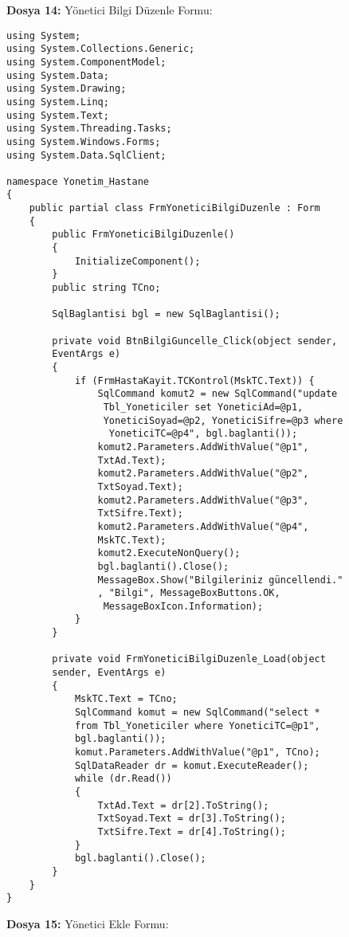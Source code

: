 \textbf{Dosya 14:} Yönetici Bilgi Düzenle Formu:

\begin{lstlisting}
using System;
using System.Collections.Generic;
using System.ComponentModel;
using System.Data;
using System.Drawing;
using System.Linq;
using System.Text;
using System.Threading.Tasks;
using System.Windows.Forms;
using System.Data.SqlClient;

namespace Yonetim_Hastane
{
    public partial class FrmYoneticiBilgiDuzenle : Form
    {
        public FrmYoneticiBilgiDuzenle()
        {
            InitializeComponent();
        }
        public string TCno;

        SqlBaglantisi bgl = new SqlBaglantisi();

        private void BtnBilgiGuncelle_Click(object sender, 
        EventArgs e)
        {
            if (FrmHastaKayit.TCKontrol(MskTC.Text)) {
                SqlCommand komut2 = new SqlCommand("update
                 Tbl_Yoneticiler set YoneticiAd=@p1, 
                 YoneticiSoyad=@p2, YoneticiSifre=@p3 where
                  YoneticiTC=@p4", bgl.baglanti());
                komut2.Parameters.AddWithValue("@p1", 
                TxtAd.Text);
                komut2.Parameters.AddWithValue("@p2", 
                TxtSoyad.Text);
                komut2.Parameters.AddWithValue("@p3", 
                TxtSifre.Text);
                komut2.Parameters.AddWithValue("@p4", 
                MskTC.Text);
                komut2.ExecuteNonQuery();
                bgl.baglanti().Close();
                MessageBox.Show("Bilgileriniz güncellendi."
                , "Bilgi", MessageBoxButtons.OK,
                 MessageBoxIcon.Information);
            }
        }

        private void FrmYoneticiBilgiDuzenle_Load(object 
        sender, EventArgs e)
        {
            MskTC.Text = TCno;
            SqlCommand komut = new SqlCommand("select * 
            from Tbl_Yoneticiler where YoneticiTC=@p1", 
            bgl.baglanti());
            komut.Parameters.AddWithValue("@p1", TCno);
            SqlDataReader dr = komut.ExecuteReader();
            while (dr.Read())
            {
                TxtAd.Text = dr[2].ToString();
                TxtSoyad.Text = dr[3].ToString();
                TxtSifre.Text = dr[4].ToString();
            }
            bgl.baglanti().Close();
        }
    }
}
\end{lstlisting}

\textbf{Dosya 15:} Yönetici Ekle Formu:

